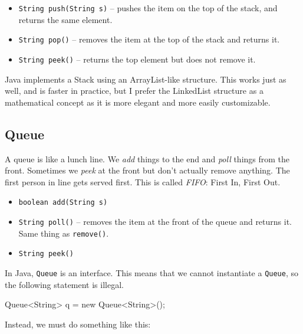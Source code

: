 \documentclass[11pt]{book}
\begin{document}
\begin{itemize}

\item \texttt{String push(String s)} -- pushes the item on the top of the stack, and returns the same element.

\item \texttt{String pop()} -- removes the item at the top of the stack and returns it.

\item \texttt{String peek()} -- returns the top element but does not remove it.

\end{itemize}

Java implements a Stack using an ArrayList-like structure. This works just as well, and is faster in practice, but I prefer the LinkedList structure as a mathematical concept as it is more elegant and more easily customizable.

\subsection{Queue}

A queue is like a lunch line. We \textit{add} things to the end and \textit{poll} things from the front. Sometimes we \textit{peek} at the front but don't actually remove anything. The first person in line gets served first. This is called \textit{FIFO}: First In, First Out.

\begin{itemize}

\item \texttt{boolean add(String s)}

\item \texttt{String poll()} -- removes the item at the front of the queue and returns it. Same thing as \texttt{remove()}.

\item \texttt{String peek()}

\end{itemize}

In Java, \texttt{Queue} is an interface. This means that we cannot instantiate a \texttt{Queue}, so the following statement is illegal.

\begin{mylstlisting}
Queue<String> q = new Queue<String>();
\end{mylstlisting}

Instead, we must do something like this:
\end{document}
